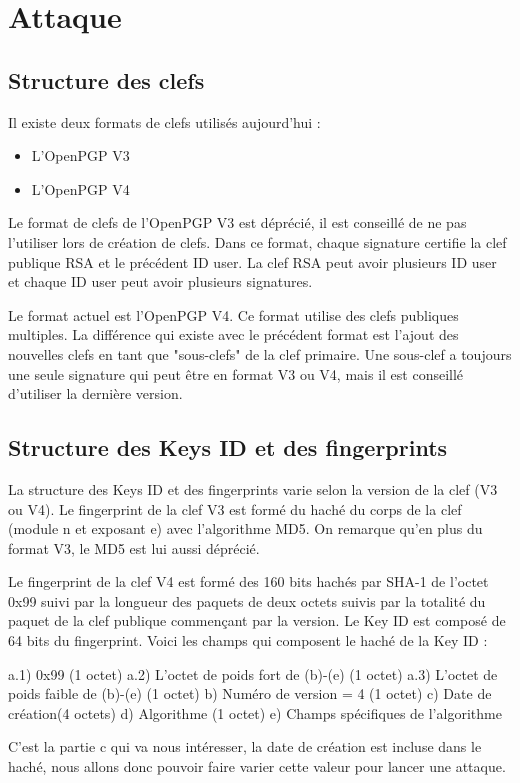\section{Attaque}
\subsection{Structure des clefs}

Il existe deux formats de clefs utilisés aujourd'hui : 
\begin{itemize}
\item L'OpenPGP V3
\item L'OpenPGP V4
\end{itemize}

Le format de clefs de l'OpenPGP V3 est déprécié, il est conseillé de ne pas l'utiliser lors de création de clefs. Dans ce format, chaque signature certifie la clef
publique RSA et le précédent ID user. La clef RSA peut avoir plusieurs ID user et chaque ID user peut avoir plusieurs signatures.

Le format actuel est l'OpenPGP V4. Ce format utilise des clefs publiques multiples. La différence qui existe avec le précédent format est l'ajout des nouvelles clefs
en tant que "sous-clefs" de la clef primaire.
Une sous-clef a toujours une seule signature qui peut être en format V3 ou V4, mais il est conseillé d'utiliser la dernière version.


\subsection{Structure des Keys ID et des fingerprints}

La structure des Keys ID et des fingerprints varie selon la version de la clef (V3 ou V4). 
Le fingerprint de la clef V3 est formé du haché du corps de la clef (module n et exposant e) avec l'algorithme MD5. On remarque qu'en plus du format V3, le MD5 
est lui aussi déprécié. 

Le fingerprint de la clef V4 est formé des 160 bits hachés par SHA-1 de l'octet 0x99 suivi par la longueur des paquets de deux octets suivis par la totalité du paquet
de la clef publique commençant par la version.
Le Key ID est composé de 64 bits du fingerprint.
Voici les champs qui composent le haché de la Key ID :

a.1) 0x99 (1 octet)
a.2) L'octet de poids fort de (b)-(e) (1 octet)
a.3) L'octet de poids faible de (b)-(e) (1 octet)
  b) Numéro de version = 4 (1 octet)
  c) Date de création(4 octets)
  d) Algorithme (1 octet)
  e) Champs spécifiques de l'algorithme


C'est la partie c qui va nous intéresser, la date de création est incluse dans le haché, nous allons donc pouvoir faire varier cette valeur pour lancer une attaque.